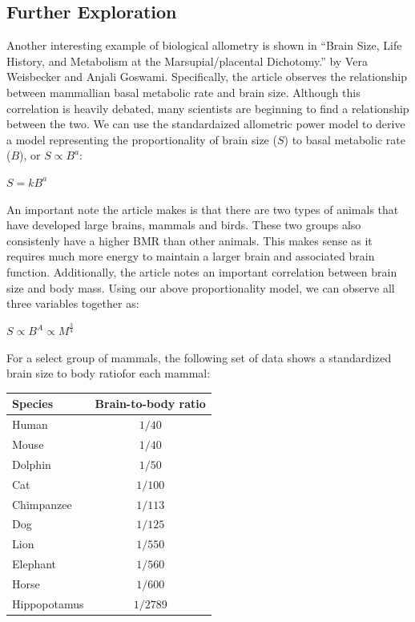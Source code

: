 \documentclass[10pt,letterpaper]{article}
\begin{document}
		\subsection{Further Exploration}
			Another interesting example of biological allometry is shown in “Brain Size, Life History, and Metabolism at the Marsupial/placental Dichotomy.” by Vera Weisbecker and Anjali Goswami. Specifically, the article observes the relationship between mammallian basal metabolic rate and brain size. Although this correlation is heavily debated, many scientists are beginning to find a relationship between the two. We can use the standardaized allometric power model to derive a model representing the proportionality of brain size ($S$) to basal metabolic rate ($B$), or $S \propto B^{a}$:
			\newline
			\centerline{$S = kB^{a}$}
			\newline
			An important note the article makes is that there are two types of animals that have developed large brains, mammals and birds. These two groups also consistenly have a higher BMR than other animals. This makes sense as it requires much more energy to maintain a larger brain and associated brain function. 
			\newline \newline
			Additionally, the article notes an important correlation between brain size and body mass. Using our above proportionality model, we can observe all three variables together as:
			\newline
			\centerline{$S \propto B^{A} \propto M^{\frac 3 4}$}
			\newline
			For a select group of mammals, the following set of data shows a standardized brain size to body ratiofor each mammal:
			\begin{center}
				\begin{tabular}{l c}
					Species & Brain-to-body ratio \\
					\hline 
					Human & $1/40$ \\
					Mouse & $1/40$ \\
					Dolphin & $1/50$ \\
					Cat & $1/100$ \\
					Chimpanzee & $1/113$ \\
					Dog & $1/125$ \\
					Lion & $1/550$ \\
					Elephant & $1/560$ \\
					Horse & $1/600$ \\
					Hippopotamus & $1/2789$
				\end{tabular}
			\end{center}
\end{document}

